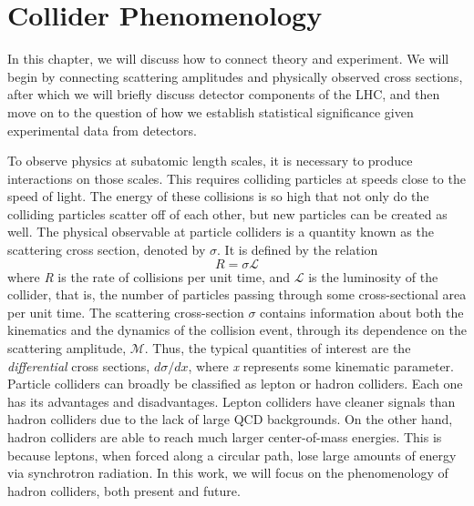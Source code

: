 \chapter{Collider Phenomenology}\label{ch:ColliderPheno}
In this chapter, we will discuss how to connect theory and experiment. We will begin by connecting scattering amplitudes and physically observed cross sections, after which we will briefly discuss detector components of the LHC, and then move on to the question of how we establish statistical significance given experimental data from detectors.

To observe physics at subatomic length scales, it is necessary to produce interactions on those scales. This requires colliding particles at speeds close to the speed of light. The energy of these collisions is so high that not only do the colliding particles scatter off of each other, but new particles can be created as well. 
The physical observable at particle colliders is a quantity known as the scattering cross section, denoted by $\sigma$. It is defined by the relation
\[R = \sigma\mathcal{L}\]
where \emph{R} is the rate of collisions per unit time, and $\mathcal{L}$ is the luminosity of the collider, that is, the number of particles passing through some cross-sectional area per unit time. The scattering cross-section $\sigma$ contains information about both the kinematics and the dynamics of the collision event, through its dependence on the scattering amplitude, $\mathcal{M}$. Thus, the typical quantities of interest are the \emph{differential} cross sections, $d\sigma/dx$, where \emph{x} represents some kinematic parameter. 
Particle colliders can broadly be classified as lepton or hadron colliders. Each one has its advantages and disadvantages. Lepton colliders have cleaner signals than hadron colliders due to the lack of large QCD backgrounds. On the other hand, hadron colliders are able to reach much larger center-of-mass energies. This is because leptons, when forced along a circular path, lose large amounts of energy via synchrotron radiation. In this work, we will focus on the phenomenology of hadron colliders, both present and future.

